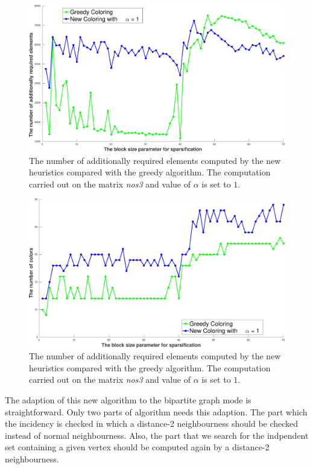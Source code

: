 \documentclass[12pt, oneside]{book}
\begin{document}
\begin{figure}
\centering
\includegraphics[width=0.9\linewidth]{bls_add_alpha_1_nos3}
\caption{The number of additionally required elements computed by the new heuristics compared with the 
greedy algorithm. The computation carried out on the matrix \textit{nos3} and value of $\alpha$ is 
set to $1$.}
\label{new.col.add.alpha.one.nos3}
\end{figure}
\begin{figure}
\centering
\includegraphics[width=0.9\linewidth]{bls_col_alpha_1_nos3}
\caption{The number of additionally required elements computed by the new heuristics compared with the 
greedy algorithm. The computation carried out on the matrix \textit{nos3} and value of $\alpha$ is 
set to $1$.}
\label{new.col.col.alpha.one.nos3}
\end{figure}

The adaption of this new algorithm to the bipartite graph mode is straightforward.
Only two parts of algorithm needs this adaption. The part which the incidency is checked 
in which a distance-2 neighbourness should be checked instead of normal neighbourness.
Also, the part that we search for the indpendent set containing a given vertex should 
be computed again by a distance-2 neighbourness.
\end{document}
